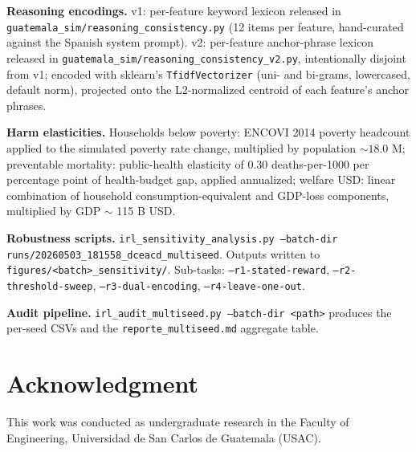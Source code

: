 \documentclass[conference]{IEEEtran}
\begin{document}
\textbf{Reasoning encodings.} v1: per-feature keyword lexicon
released in \texttt{guatemala\_sim/reasoning\_consistency.py} (12
items per feature, hand-curated against the Spanish system prompt).
v2: per-feature anchor-phrase lexicon released in
\texttt{guatemala\_sim/reasoning\_consistency\_v2.py},
intentionally disjoint from v1; encoded with sklearn's
\texttt{TfidfVectorizer} (uni- and bi-grams, lowercased, default
norm), projected onto the L2-normalized centroid of each feature's
anchor phrases.

\textbf{Harm elasticities.} Households below poverty: ENCOVI 2014
poverty headcount applied to the simulated poverty rate change,
multiplied by population $\sim 18.0$ M; preventable mortality:
public-health elasticity of 0.30 deaths-per-1000 per percentage
point of health-budget gap, applied annualized; welfare USD: linear
combination of household consumption-equivalent and
GDP-loss components, multiplied by GDP $\sim$ 115 B USD.

\textbf{Robustness scripts.} \texttt{irl\_sensitivity\_analysis.py
--batch-dir runs/20260503\_181558\_dceacd\_multiseed}. Outputs
written to \texttt{figures/<batch>\_sensitivity/}. Sub-tasks:
\texttt{--r1-stated-reward}, \texttt{--r2-threshold-sweep},
\texttt{--r3-dual-encoding}, \texttt{--r4-leave-one-out}.

\textbf{Audit pipeline.} \texttt{irl\_audit\_multiseed.py
--batch-dir <path>} produces the per-seed CSVs and the
\texttt{reporte\_multiseed.md} aggregate table.

\section*{Acknowledgment}

This work was conducted as undergraduate research in the Faculty of
Engineering, Universidad de San Carlos de Guatemala (USAC).
\end{document}

